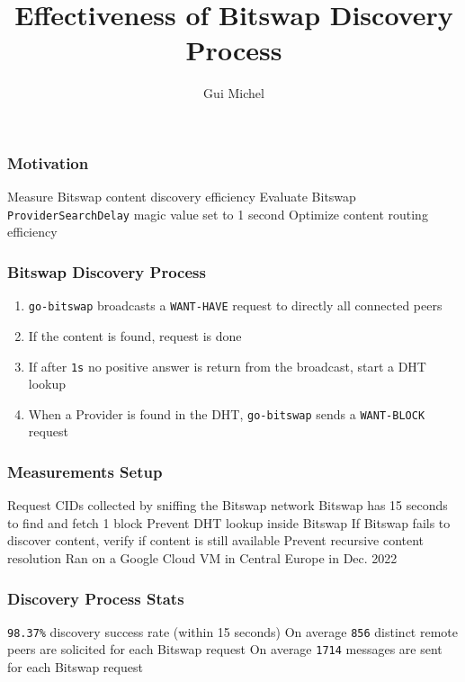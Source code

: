 \documentclass{../pl-slide}
\title{Effectiveness of Bitswap Discovery Process }
\author{Gui Michel}
\institute{Protocol Labs}
\date{\DTMdate{2023-04-15}}
\begin{document}
\frame{\titlepage}

\begin{frame}
\frametitle{Motivation}
\begin{itemize}
        \itemc Measure Bitswap content discovery efficiency
        \itemc Evaluate Bitswap \texttt{ProviderSearchDelay} magic value set to 1 second
        \itemc Optimize content routing efficiency

\end{itemize}
\end{frame}

\begin{frame}
\frametitle{Bitswap Discovery Process}

\begin{enumerate}
	\item \texttt{go-bitswap} broadcasts a \texttt{WANT-HAVE} request to directly all connected peers
	\item If the content is found, request is done
	\item If after \texttt{1s} no positive answer is return from the broadcast, start a DHT lookup
	\item When a Provider is found in the DHT, \texttt{go-bitswap} sends a \texttt{WANT-BLOCK} request
\end{enumerate}

\end{frame}

\begin{frame}
\frametitle{Measurements Setup}
\begin{itemize}
        \itemc Request CIDs collected by sniffing the Bitswap network
        \itemc Bitswap has 15 seconds to find and fetch 1 block
        \itemc Prevent DHT lookup inside Bitswap
        \itemc If Bitswap fails to discover content, verify if content is still available
        \itemc Prevent recursive content resolution
        \itemc Ran on a Google Cloud VM in Central Europe in Dec. 2022
\end{itemize}
\end{frame}

\begin{frame}
\frametitle{Discovery Process Stats}
\begin{itemize}
        \itemc \texttt{98.37\%} discovery success rate (within 15 seconds)
        \itemc On average \texttt{856} distinct remote peers are solicited for each Bitswap request
        \itemc On average \texttt{1714} messages are sent for each Bitswap request
\end{itemize}
\end{frame}
\end{document}
